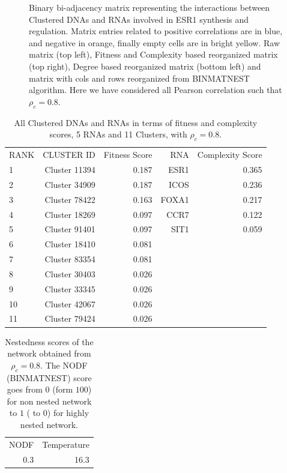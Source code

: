 \documentclass[10pt,a4paper]{article}
\begin{document}
\begin{figure}[h!]
\begin{center}
{%
}
\end{center}
\caption{\label{fig:fig2}Binary bi-adjacency matrix representing the interactions between Clustered DNAs and RNAs involved in ESR1 synthesis and regulation. Matrix entries related to positive correlations are in blue, and negative in orange, finally empty cells are in bright yellow. Raw matrix (top left), Fitness and Complexity based reorganized matrix (top right), Degree based reorganized matrix (bottom left) and matrix with cols and rows reorganized from BINMATNEST algorithm. Here we have considered all Pearson correlation such that $\rho_{c} = 0.8$.}
\end{figure}
 \begin{table}[h!]
\centering
\caption{\label{tab:tab4} All Clustered DNAs and RNAs in terms of fitness and complexity scores, 5 RNAs and 11 Clusters, with $\rho_{c} = 0.8$.}
\begin{tabular}{l|rr|rr|}
\cline{1-5}
RANK & CLUSTER ID & Fitness Score & RNA & Complexity Score\\
\cline{1-5}
1 & Cluster 11394 & 0.187 & ESR1 & 0.365\\
2 & Cluster 34909 & 0.187 & ICOS & 0.236\\
3 & Cluster 78422 & 0.163 & FOXA1 & 0.217\\
4 & Cluster 18269 & 0.097 & CCR7 & 0.122\\
5 & Cluster 91401 & 0.097 & SIT1 & 0.059\\
6 & Cluster 18410 & 0.081 & & \\
7 & Cluster 83354 & 0.081 & &\\
8 & Cluster 30403 & 0.026 & & \\
9 & Cluster 33345 & 0.026 & & \\
10 & Cluster 42067 & 0.026 & & \\
11 & Cluster 79424 & 0.026 & & \\
\cline{1-5}
\end{tabular}
\end{table}
\begin{table}[h!]
\centering
\caption{\label{tab:tab5}Nestedness scores of the network obtained from $\rho_{c} = 0.8$. The NODF (BINMATNEST) score goes from $0$ (form $100$) for non nested network to $1$ ( to $0$) for highly nested network.}
\begin{tabular}{|r|r|}
\cline{1-2}
NODF & Temperature\\
\cline{1-2}
0.3 & 16.3\\
\cline{1-2}
\end{tabular}
\end{table}
\clearpage
\printbibliography
\end{document}
